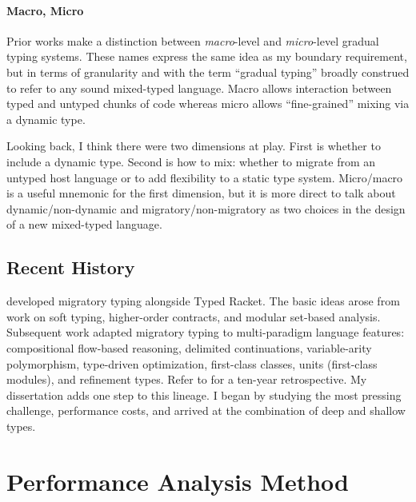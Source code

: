 \documentclass[ twoside,open=right,titlepage,numbers=noenddot,headinclude,%
                footinclude=true,cleardoublepage=empty,abstract=off,
                BCOR=5mm,paper=a4,fontsize=11pt,%
                ngerman,american,%
                parts,pdfspacing]{scrreprt}
\newcommand{\sectionNewpage}{}
\let\SOriginalthesubsection\thesubsection
\let\SOriginalthesubsubsection\thesubsubsection
\newcommand{\Ssection}[2]{\section[#1]{#2}\let\thesubsection\SOriginalthesubsection}
\newcommand{\Ssubsection}[2]{\subsection[#1]{#2}\let\thesubsubsection\SOriginalthesubsubsection}
\newcommand{\Ssubsubsubsectionstar}[1]{{\bf #1}}
\newcommand{\Ssubsubsubsectionstarx}[2]{\Ssubsubsubsectionstar{#2}}
\renewcommand{\Ssection}[2]{\chapter[#1]{#2}}
\renewcommand{\Ssubsection}[2]{\section[#1]{#2}}
\renewcommand{\Ssubsubsubsectionstar}[1]{\subsubsection*{#1}}
\renewcommand{\Ssubsubsubsectionstarx}[2]{\Ssubsubsubsectionstar{#2}\addcontentsline{toc}{subsubsection}{#1}}
\begin{document}
\Ssubsubsubsectionstarx{Macro, Micro}{Macro, Micro}\label{t:x28part_x22Macrox5fx5fMicrox22x29}

Prior works make a distinction between \emph{macro}{-}level and \emph{micro}{-}level
 gradual typing systems.
These names express the same idea as my boundary requirement,
 but in terms of granularity and with the term {``}gradual typing{''} broadly
 construed to refer to any sound mixed{-}typed language.
Macro allows interaction between typed and untyped chunks of code
 whereas micro allows {``}fine{-}grained{''} mixing via a dynamic type.

Looking back, I think there were two dimensions at play.
First is whether to include a dynamic type.
Second is how to mix: whether to migrate from an untyped host language
 or to add flexibility to a static type system.
Micro/macro is a useful mnemonic for the first dimension,
 but it is more direct to talk about dynamic/non{-}dynamic and migratory/non{-}migratory
 as two choices in the design of a new mixed{-}typed language.

\Ssubsection{Recent History}{Recent History}\label{t:x28part_x22secx3awhyx3ahistoryx22x29}

 developed migratory typing alongside Typed Racket.
The basic ideas arose from work on soft typing,
 higher{-}order contracts,
 and modular set{-}based analysis.
Subsequent work adapted migratory typing to
 multi{-}paradigm language features:
 compositional flow{-}based reasoning,
 delimited continuations,
 variable{-}arity polymorphism,
 type{-}driven optimization,
 first{-}class classes,
 units (first{-}class modules),
 and refinement types.
Refer to  for a ten{-}year retrospective.
My dissertation adds one step to this lineage.
I began by studying the most pressing challenge, performance costs, and
 arrived at the combination of deep and shallow types.

\sectionNewpage

\Ssection{Performance Analysis Method}{Performance Analysis Method}\label{t:x28part_x22chapx3aperformancex22x29}
\end{document}
